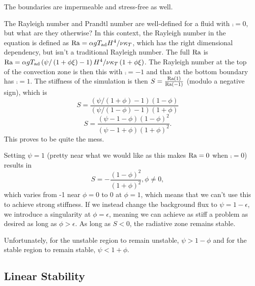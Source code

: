 	The boundaries are impermeable and stress-free as well.

	The Rayleigh number and Prandtl number are well-defined for a fluid with $\comp=0$, but what are they otherwise?
		In this context, the Rayleigh number in the equation is defined as $\mathrm{Ra}=\alpha g T_{\mathrm{ad}} H^{4}/\nu\kappa_{T}$, which has the right dimensional dependency, but isn't a traditional Rayleigh number.
			The full $\mathrm{Ra}$ is $\mathrm{Ra}=\alpha g T_{\mathrm{ad}} \left(\psi/\left(1 + \phi\xi\right) - 1\right) H^{4}/\nu\kappa_{T}\left(1+\phi\xi\right)$.
			The Rayleigh number at the top of the convection zone is then this with $\comp=-1$ and that at the bottom boundary has $\comp=1$.
		The stiffness of the simulation is then $S=\frac{\mathrm{Ra}\left(1\right)}{\mathrm{Ra}\left(-1\right)}$ (modulo a negative sign), which is
		\begin{equation}
			S=\frac{\left(\psi/\left(1 + \phi\right) - 1\right)\left(1-\phi\right)}{\left(\psi/\left(1 - \phi\right) - 1\right)\left(1+\phi\right)}
		\end{equation}
		\begin{equation}
			S=\frac{\left(\psi - 1 - \phi\right)\left(1-\phi\right)^{2}}{\left(\psi - 1 + \phi\right)\left(1+\phi\right)^{2}}.
		\end{equation}
		This proves to be quite the mess.

	Setting $\psi=1$ (pretty near what we would like as this makes $\mathrm{Ra}=0$ when $\comp=0$) results in
		\begin{equation}
			S=-\frac{\left(1-\phi\right)^{2}}{\left(1+\phi\right)^{2}},\phi\ne0,
		\end{equation}
		which varies from -1 near $\phi=0$ to 0 at $\phi=1$, which means that we can't use this to achieve strong stiffness.
		If we instead change the background flux to $\psi=1-\epsilon$, we introduce a singularity at $\phi=\epsilon$, meaning we can achieve as stiff a problem as desired as long as $\phi>\epsilon$.
		As long as $S<0$, the radiative zone remains stable.

	Unfortunately, for the unstable region to remain unstable, $\psi>1-\phi$ and for the stable region to remain stable, $\psi<1+\phi$.


\subsection{Linear Stability} %
\label{sub:linear_stability}

